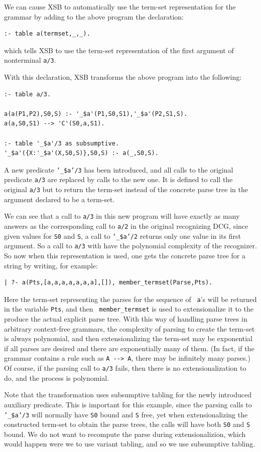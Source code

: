 We can cause XSB to automatically use the term-set representation for
the grammar by adding to the above program the declaration:
\begin{verbatim}
:- table a(termset,_,_).
\end{verbatim}
which tells XSB to use the term-set representation of the first
argument of nonterminal {\tt a/3}.

With this declaration, XSB transforms the above program into the
following:
\begin{verbatim}
:- table a/3.

a(a(P1,P2),S0,S) :- '_$a'(P1,S0,S1),'_$a'(P2,S1,S).
a(a,S0,S1) --> 'C'(S0,a,S1).

:- table '_$a'/3 as subsumptive.
'_$a'({X:'_$a'(X,S0,S)},S0,S) :- a(_,S0,S).
\end{verbatim}
A new predicate {\tt '\_\$a'/3} has been introduced, and all calls to the
original predicate {\tt a/3} are replaced by calls to the new one.  It
is defined to call the original {\tt a/3} but to return the term-set
instead of the concrete parse tree in the argument declared to be a
term-set.

We can see that a call to {\tt a/3} in this new program will have
exactly as many answers as the corresponding call to {\tt a/2} in the
original recognizing DCG, since given values for {\tt S0} and {\tt S},
a call to {\tt '\_\$a'/2} returns only one value in its first
argument.  So a call to {\tt a/3} with have the polynomial complexity
of the recognizer.  So now when this representation is used, one gets
the concrete parse tree for a string by writing, for example:
\begin{verbatim}
| ?- a(Pts,[a,a,a,a,a,a,a],[]), member_termset(Parse,Pts).
\end{verbatim}
Here the term-set representing the parses for the sequence of {\tt
a}'s will be returned in the variable {\tt Pts}, and then {\tt
member\_termset} is used to extensionalize it
to the produce the actual explicit parse
tree.  With this way of handling parse trees in arbitrary context-free
grammars, the complexity of parsing to create the term-set is always
polynomial, and then extensionalizing the term-set may be exponential
if all parses are desired and there are exponentially many of them.
(In fact, if the grammar contains a rule such as \verb|A --> A|, there
may be infinitely many parses.)
Of course, if the parsing call to {\tt a/3} fails, then there is no
extensionalization to do, and the process is polynomial.

Note that the transformation uses subsumptive tabling for the newly
introduced auxiliary predicate.  This is important for this example,
since the parsing calls to {\tt '\_\$a'/3} will normally have {\tt S0}
bound and {\tt S} free, yet when extensionalizing the constructed
term-set to obtain the parse trees, the calls will have both {\tt S0}
and {\tt S} bound.  We do not want to recompute the parse during
extensionalizion, which would happen were we to use variant
tabling, and so we use subsumptive tabling.

